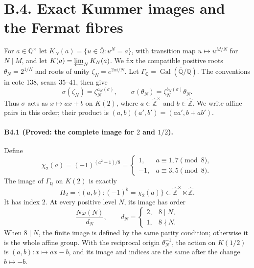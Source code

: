 \section{B.4. Exact Kummer images and the Fermat fibres}

For $a\in\mathbb Q^\times$ let
$K_N(a)=\{u\in\overline{\mathbb Q}:u^N=a\}$, with transition map
$u\mapsto u^{M/N}$ for $N\mid M$, and let
$K(a)=\varprojlim_NK_N(a)$. We fix the compatible positive roots
$\theta_N=2^{1/N}$ and roots of unity $\zeta_N=e^{2\pi i/N}$.
Let $\Gamma_{\mathbb Q}=\operatorname{Gal}(\overline{\mathbb Q}/\mathbb Q)$.
The conventions in cote 138, scans 35--41, then give
\[
 \sigma(\zeta_N)=\zeta_N^{a_N(\sigma)},\qquad
 \sigma(\theta_N)=\zeta_N^{b_N(\sigma)}\theta_N.
\]
Thus $\sigma$ acts as $x\mapsto ax+b$ on $K(2)$, where
$a\in\widehat{\mathbb Z}^{\times}$ and $b\in\widehat{\mathbb Z}$.
We write affine pairs in this order; their product is
$(a,b)(a',b')=(aa',b+ab')$.

\paragraph{B4.1 (Proved: the complete image for $2$ and $1/2$).}
\label{B4.1}
Define
\[
 \chi_2(a)=(-1)^{(a^2-1)/8}
 =\begin{cases}1,&a\equiv1,7\pmod8,\\-1,&a\equiv3,5\pmod8.
 \end{cases}
\]
The image of $\Gamma_{\mathbb Q}$ on $K(2)$ is exactly
\[
 H_2=\{(a,b):(-1)^b=\chi_2(a)\}
 \subset\widehat{\mathbb Z}^{\times}\ltimes\widehat{\mathbb Z}.
\]
It has index $2$. At every positive level $N$, its image has order
\[
 \frac{N\varphi(N)}{d_N},\qquad
 d_N=\begin{cases}2,&8\mid N,\\1,&8\nmid N.\end{cases}
\]
When $8\mid N$, the finite image is defined by the same parity
condition; otherwise it is the whole affine group.
With the reciprocal origin $\theta_N^{-1}$, the action on $K(1/2)$ is
$(a,b):x\mapsto ax-b$, and its image and indices are the same after
the change $b\mapsto-b$.

